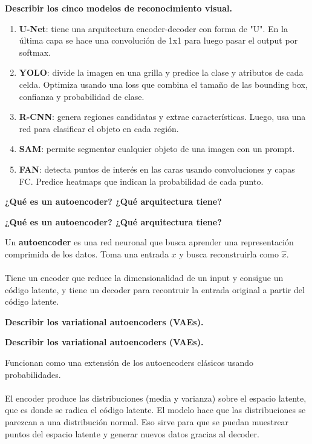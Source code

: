\documentclass[10pt]{memoir}
\begin{document}
\clearpage
\begin{center}
	\textbf{\Large Describir los cinco modelos de reconocimiento visual.}
\end{center}
\begin{enumerate}
	\item \textbf{U-Net}: tiene una arquitectura encoder-decoder con forma de "U". En la última capa se hace una convolución de 1x1 para luego pasar el output por softmax.
	\item \textbf{YOLO}: divide la imagen en una grilla y predice la clase y atributos de cada celda. Optimiza usando una loss que combina el tamaño de las bounding box, confianza y probabilidad de clase.
	\item \textbf{R-CNN}: genera regiones candidatas y extrae características. Luego, usa una red para clasificar el objeto en cada región.
	\item \textbf{SAM}: permite segmentar cualquier objeto de una imagen con un prompt.
	\item \textbf{FAN}: detecta puntos de interés en las caras usando convoluciones y capas FC. Predice heatmaps que indican la probabilidad de cada punto.
\end{enumerate}


\clearpage
\begin{center}
	\textbf{\Large ¿Qué es un autoencoder? ¿Qué arquitectura tiene?}
\end{center}

\clearpage
\begin{center}
	\textbf{\Large ¿Qué es un autoencoder? ¿Qué arquitectura tiene?}
\end{center}
\noindent Un \textbf{autoencoder} es una red neuronal que busca aprender una representación comprimida de los datos. Toma una entrada $x$ y busca reconstruirla como $\hat{x}$. \\
\\
\noindent Tiene un encoder que reduce la dimensionalidad de un input y consigue un código latente, y tiene un decoder para recontruir la entrada original a partir del código latente.

\clearpage
\begin{center}
	\textbf{\Large Describir los variational autoencoders (VAEs).}
\end{center}

\clearpage
\begin{center}
	\textbf{\Large Describir los variational autoencoders (VAEs).}
\end{center}
\noindent Funcionan como una extensión de los autoencoders clásicos usando probabilidades. \\
\\
\noindent El encoder produce las distribuciones (media y varianza) sobre el espacio latente, que es donde se radica el código latente. El modelo hace que las distribuciones se parezcan a una distribución normal. Eso sirve para que se puedan muestrear puntos del espacio latente y generar nuevos datos gracias al decoder.
\end{document}
